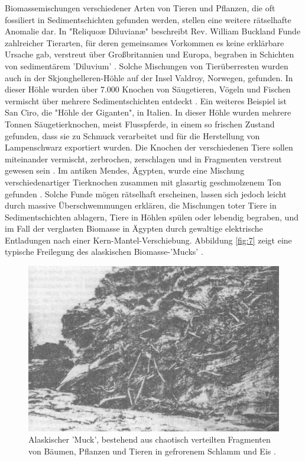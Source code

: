 \documentclass[10pt,twocolumn,letterpaper]{article}
\begin{document}
Biomassemischungen verschiedener Arten von Tieren und Pflanzen, die oft fossiliert in Sedimentschichten gefunden werden, stellen eine weitere rätselhafte Anomalie dar. In "Reliquoæ Diluvianæ" beschreibt Rev. William Buckland Funde zahlreicher Tierarten, für deren gemeinsames Vorkommen es keine erklärbare Ursache gab, verstreut über Großbritannien und Europa, begraben in Schichten von sedimentärem 'Diluvium' \cite{58}. Solche Mischungen von Tierüberresten wurden auch in der Skjonghelleren-Höhle auf der Insel Valdroy, Norwegen, gefunden. In dieser Höhle wurden über 7.000 Knochen von Säugetieren, Vögeln und Fischen vermischt über mehrere Sedimentschichten entdeckt \cite{59}. Ein weiteres Beispiel ist San Ciro, die "Höhle der Giganten", in Italien. In dieser Höhle wurden mehrere Tonnen Säugetierknochen, meist Flusspferde, in einem so frischen Zustand gefunden, dass sie zu Schmuck verarbeitet und für die Herstellung von Lampenschwarz exportiert wurden. Die Knochen der verschiedenen Tiere sollen miteinander vermischt, zerbrochen, zerschlagen und in Fragmenten verstreut gewesen sein \cite{60,61}. Im antiken Mendes, Ägypten, wurde eine Mischung verschiedenartiger Tierknochen zusammen mit glasartig geschmolzenem Ton gefunden \cite{57}. Solche Funde mögen rätselhaft erscheinen, lassen sich jedoch leicht durch massive Überschwemmungen erklären, die Mischungen toter Tiere in Sedimentschichten ablagern, Tiere in Höhlen spülen oder lebendig begraben, und im Fall der verglasten Biomasse in Ägypten durch gewaltige elektrische Entladungen nach einer Kern-Mantel-Verschiebung. Abbildung \ref{fig:7} zeigt eine typische Freilegung des alaskischen Biomasse-'Mucks' \cite{56}.

\begin{figure}[t]
\begin{center}
   \includegraphics[width=1\linewidth]{muck-crop.jpeg}
\end{center}
   \caption{Alaskischer 'Muck', bestehend aus chaotisch verteilten Fragmenten von Bäumen, Pflanzen und Tieren in gefrorenem Schlamm und Eis \cite{146}.}
\label{fig:7}
\label{fig:onecol}
\end{figure}
\end{document}

